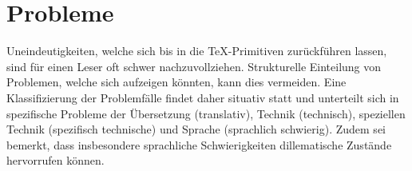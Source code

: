 


\section{Probleme}
Uneindeutigkeiten, welche sich bis in die \TeX{}-Primitiven zurückführen lassen, sind für einen Leser oft schwer nachzuvollziehen.
Strukturelle Einteilung von Problemen, welche sich aufzeigen könnten, kann dies vermeiden.
Eine Klassifizierung der Problemfälle findet daher situativ statt und unterteilt sich in spezifische Probleme der Übersetzung (translativ), Technik (technisch), speziellen Technik (spezifisch technische) und Sprache (sprachlich schwierig). Zudem sei bemerkt, dass insbesondere sprachliche Schwierigkeiten dillematische Zustände hervorrufen können.

